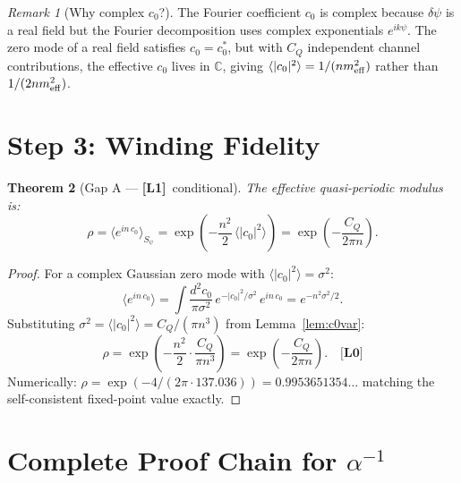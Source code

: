 \documentclass[12pt,a4paper]{article}
\newtheorem{theorem}{Theorem}[section]
\theoremstyle{definition}\newtheorem{definition}[theorem]{Definition}
\theoremstyle{remark}\newtheorem{remark}[theorem]{Remark}
\newcommand{\Lz}{\textbf{[L0]}}
\newcommand{\Lo}{\textbf{[L1]}}
\begin{document}
\begin{remark}[Why complex $c_0$?]
The Fourier coefficient $c_0$ is complex because $\delta\psi$ is
a real field but the Fourier decomposition uses complex exponentials
$e^{ik\psi}$.  The zero mode of a real field satisfies $c_0 = c_0^*$,
but with $C_Q$ independent channel contributions, the effective
$c_0$ lives in $\mathbb{C}$, giving $\langle|c_0|^2\rangle = 1/(n m^2_{\rm eff})$
rather than $1/(2n m^2_{\rm eff})$.
\end{remark}

\section{Step 3: Winding Fidelity}
\label{sec:step3}

\begin{theorem}[Gap A — \Lo\ conditional]
\label{thm:gapA}
The effective quasi-periodic modulus is:
\[
  \rho
  = \bigl\langle e^{in\,c_0}\bigr\rangle_{S_\psi}
  = \exp\!\left(-\frac{n^2}{2}\,\langle|c_0|^2\rangle\right)
  = \exp\!\left(-\frac{C_Q}{2\pi n}\right).
\]
\end{theorem}

\begin{proof}
For a complex Gaussian zero mode with $\langle|c_0|^2\rangle = \sigma^2$:
\[
  \bigl\langle e^{in\,c_0}\bigr\rangle
  = \int \frac{d^2c_0}{\pi\sigma^2}\,
    e^{-|c_0|^2/\sigma^2}\,e^{in\,c_0}
  = e^{-n^2\sigma^2/2}.
\]
Substituting $\sigma^2 = \langle|c_0|^2\rangle = C_Q/(\pi n^3)$
from Lemma~\ref{lem:c0var}:
\[
  \rho = \exp\!\left(-\frac{n^2}{2}\cdot\frac{C_Q}{\pi n^3}\right)
  = \exp\!\left(-\frac{C_Q}{2\pi n}\right). \quad \Lz
\]
Numerically: $\rho = \exp(-4/(2\pi\cdot 137.036)) = 0.9953651354\ldots$
matching the self-consistent fixed-point value exactly.
\end{proof}

\section{Complete Proof Chain for $\alpha^{-1}$}
\label{sec:chain}
\end{document}
